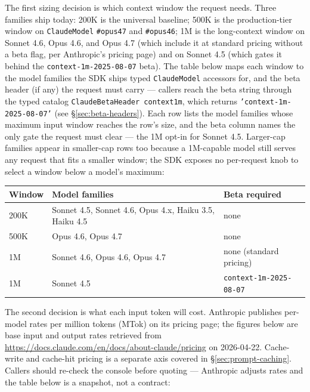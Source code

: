 \documentclass[a4paper,10pt,fleqn]{article}
\newcommand{\cls}[1]{\texttt{#1}}
\newcommand{\sel}[1]{\texttt{\##1}}
\begin{document}
The first sizing decision is which context window the request needs.
Three families ship today: 200K is the universal baseline; 500K is
the production-tier window on \cls{ClaudeModel} \sel{opus47} and
\sel{opus46}; 1M is the long-context window on Sonnet 4.6, Opus 4.6,
and Opus 4.7 (which include it at standard pricing without a beta
flag, per Anthropic's pricing page) and on Sonnet 4.5 (which gates
it behind the \texttt{context-1m-2025-08-07} beta).  The table below
maps each window to the model families the SDK ships typed
\cls{ClaudeModel} accessors for, and the beta header (if any) the
request must carry --- callers reach the beta string through the
typed catalog \texttt{ClaudeBetaHeader context1m}, which returns
\texttt{'context-1m-2025-08-07'} (see §\ref{sec:beta-headers}).
Each row lists the model families whose maximum input window reaches
the row's size, and the beta column names the only gate the request
must clear --- the 1M opt-in for Sonnet 4.5.  Larger-cap families
appear in smaller-cap rows too because a 1M-capable model still
serves any request that fits a smaller window; the SDK exposes no
per-request knob to select a window below a model's maximum:

\begin{center}
\small
\begin{tabular}{@{}lp{6.0cm}p{3.6cm}@{}}
\toprule
\textbf{Window} & \textbf{Model families} & \textbf{Beta required} \\
\midrule
200K & Sonnet 4.5, Sonnet 4.6, Opus 4.x, Haiku 3.5, Haiku 4.5 & none \\
500K & Opus 4.6, Opus 4.7 & none \\
1M   & Sonnet 4.6, Opus 4.6, Opus 4.7 & none (standard pricing) \\
1M   & Sonnet 4.5 & \texttt{context-1m-2025-08-07} \\
\bottomrule
\end{tabular}
\end{center}

The second decision is what each input token will cost.  Anthropic
publishes per-model rates per million tokens (MTok) on its pricing
page; the figures below are base input and output rates retrieved
from \url{https://docs.claude.com/en/docs/about-claude/pricing} on
2026-04-22.  Cache-write and cache-hit pricing is a separate axis
covered in §\ref{sec:prompt-caching}.  Callers should re-check the
console before quoting --- Anthropic adjusts rates and the table
below is a snapshot, not a contract:
\end{document}
